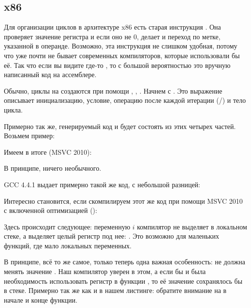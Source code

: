 \subsection{x86}

Для организации циклов в архитектуре x86 есть старая инструкция \LOOP. 
Она проверяет значение регистра \ECX и если оно не 0, делает  \ECX 
и переход по метке, указанной в операнде. 
Возможно, эта инструкция не слишком удобная, потому что уже почти не бывает современных компиляторов, 
которые использовали бы её. Так что если вы видите где-то \LOOP, то с большой вероятностью это 
вручную написанный код на ассемблере.

Обычно, циклы на \CCpp создаются при помощи , , .
Начнем с .
Это выражение описывает инициализацию, условие, операцию после каждой итерации
(/) и тело цикла.



Примерно так же, генерируемый код и будет состоять из этих четырех частей.
Возьмем пример:



Имеем в итоге (MSVC 2010):



В принципе, ничего необычного.

GCC 4.4.1 выдает примерно такой же код, с небольшой разницей:



Интересно становится, если скомпилируем этот же код при помощи MSVC 2010 с включенной оптимизацией (\TT{\Ox}):



Здесь происходит следующее: переменную $i$ компилятор не выделяет в локальном стеке, 
а выделяет целый регистр под нее: \ESI. 
Это возможно для маленьких функций, где мало локальных переменных.

В принципе, всё то же самое, только теперь одна важная особенность: 
\ttf не должна менять значение \ESI. 
Наш компилятор уверен в этом, а если бы и была необходимость использовать регистр \ESI в функции \ttf, 
то её значение сохранялось бы в стеке. Примерно так же как и в нашем листинге: 
обратите внимание на  в начале и конце функции.

